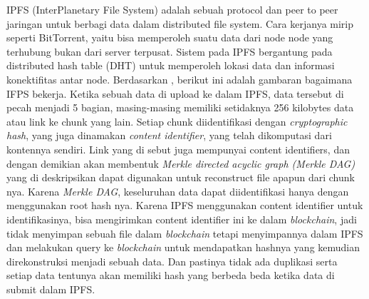 IPFS (InterPlanetary File System) adalah sebuah protocol dan
peer to peer jaringan untuk berbagi data dalam distributed file system. Cara kerjanya mirip seperti BitTorrent, yaitu bisa memperoleh
suatu data dari node node yang terhubung bukan dari server terpusat. Sistem pada IPFS bergantung pada distributed hash table
(DHT) untuk memperoleh lokasi data dan informasi konektifitas
antar node. Berdasarkan \parencite{Steichen2018}, berikut ini adalah gambaran bagaimana
IFPS bekerja. Ketika sebuah data di upload ke dalam IPFS, data tersebut
di pecah menjadi 5 bagian, masing-masing memiliki setidaknya
256 kilobytes data atau link ke chunk yang lain. Setiap chunk
diidentifikasi dengan \emph{cryptographic hash}, yang juga dinamakan \emph{content
    identifier}, yang telah dikomputasi dari kontennya sendiri. Link yang
di sebut juga mempunyai content identifiers, dan dengan demikian
akan membentuk \emph{Merkle directed acyclic graph (Merkle DAG)} yang
di deskripsikan dapat digunakan untuk reconstruct file apapun dari
chunk nya. Karena \emph{Merkle DAG}, keseluruhan data dapat
diidentifikasi hanya dengan menggunakan root hash nya. Karena IPFS
menggunakan content identifier untuk identifikasinya, bisa
mengirimkan content identifier ini ke dalam \emph{blockchain}, jadi tidak
menyimpan sebuah file dalam \emph{blockchain} tetapi menyimpannya dalam
IPFS dan melakukan query ke \emph{blockchain} untuk mendapatkan
hashnya yang kemudian direkonstruksi menjadi sebuah data. Dan
pastinya tidak ada duplikasi serta setiap data tentunya akan memiliki
hash yang berbeda beda ketika data di submit dalam IPFS.
